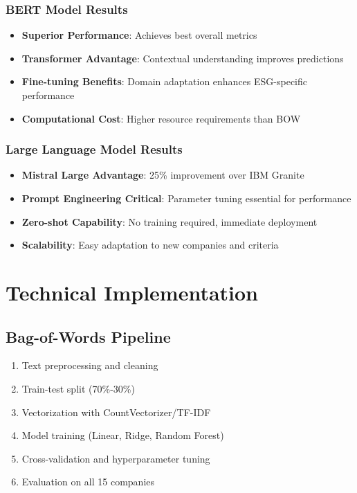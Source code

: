 \documentclass[12pt,a4paper]{article}
\begin{document}
\subsubsection{BERT Model Results}
\begin{itemize}
    \item \textbf{Superior Performance}: Achieves best overall metrics
    \item \textbf{Transformer Advantage}: Contextual understanding improves predictions
    \item \textbf{Fine-tuning Benefits}: Domain adaptation enhances ESG-specific performance
    \item \textbf{Computational Cost}: Higher resource requirements than BOW
\end{itemize}

\subsubsection{Large Language Model Results}
\begin{itemize}
    \item \textbf{Mistral Large Advantage}: 25\% improvement over IBM Granite
    \item \textbf{Prompt Engineering Critical}: Parameter tuning essential for performance
    \item \textbf{Zero-shot Capability}: No training required, immediate deployment
    \item \textbf{Scalability}: Easy adaptation to new companies and criteria
\end{itemize}

\section{Technical Implementation}

\subsection{Bag-of-Words Pipeline}
\begin{enumerate}
    \item Text preprocessing and cleaning
    \item Train-test split (70\%-30\%)
    \item Vectorization with CountVectorizer/TF-IDF
    \item Model training (Linear, Ridge, Random Forest)
    \item Cross-validation and hyperparameter tuning
    \item Evaluation on all 15 companies
\end{enumerate}
\end{document}
